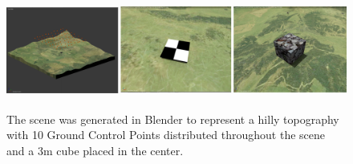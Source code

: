 \begin{figure}[H]
	\centering
	\includegraphics[height = 1.5in]{../fig/scenesummary}

	\caption{The scene was generated in Blender to represent a hilly topography with 10 Ground Control Points distributed throughout the scene and a 3m cube placed in the center.}
	\label{fig:scene}
\end{figure}
